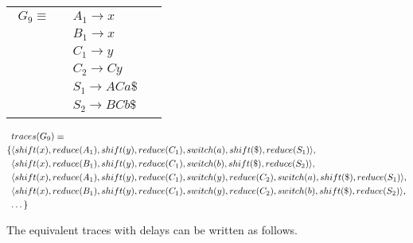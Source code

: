 \documentclass[a4paper,11pt]{article}
\begin{document}
\begin{tabular}[t]{cl}
\parbox{.3\textwidth}{
\begin{align*}
G_9 \equiv \quad & A_1 \rightarrow x\\
                 & B_1 \rightarrow x\\
                 & C_1 \rightarrow y\\
                 & C_2 \rightarrow C y\\
                 & S_1 \rightarrow A C a \$\\
                 & S_2 \rightarrow B C b \$
\end{align*}}
\parbox{.6\textwidth}{}
\end{tabular}

{\small\parbox{.3\textwidth}{\begin{align*}
&traces(G_9) \equiv \\
\{ & \langle shift(x), reduce(A_1), shift(y), reduce(C_1), switch(a), shift(\$), reduce(S_1) \rangle,\\
   & \langle shift(x), reduce(B_1), shift(y), reduce(C_1), switch(b), shift(\$), reduce(S_2) \rangle,\\
   & \langle shift(x), reduce(A_1), shift(y), reduce(C_1), switch(y), reduce(C_2), switch(a), shift(\$), reduce(S_1) \rangle,\\
   & \langle shift(x), reduce(B_1), shift(y), reduce(C_1), switch(y), reduce(C_2), switch(b), shift(\$), reduce(S_2) \rangle,\\
   & \textellipsis \}
\end{align*}}}

The equivalent traces with delays can be written as follows.
\end{document}
